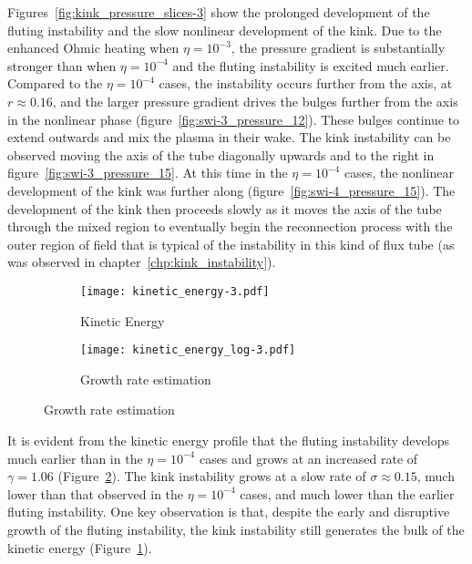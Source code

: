 Figures~\ref{fig:kink_pressure_slices-3} show the prolonged development of the fluting instability and the slow nonlinear development of the kink. Due to the enhanced Ohmic heating when $\eta=10^{-3}$, the pressure gradient is substantially stronger than when $\eta=10^{-4}$ and the fluting instability is excited much earlier. Compared to the $\eta=10^{-4}$ cases, the instability occurs further from the axis, at $r\approx0.16$, and the larger pressure gradient drives the bulges further from the axis in the nonlinear phase (figure~\ref{fig:swi-3_pressure_12}). These bulges continue to extend outwards and mix the plasma in their wake. The kink instability can be observed moving the axis of the tube diagonally upwards and to the right in figure~\ref{fig:swi-3_pressure_15}. At this time in the $\eta=10^{-4}$ cases, the nonlinear development of the kink was further along (figure~\ref{fig:swi-4_pressure_15}). The development of the kink then proceeds slowly as it moves the axis of the tube through the mixed region to eventually begin the reconnection process with the outer region of field that is typical of the instability in this kind of flux tube (as was observed in chapter~\ref{chp:kink_instability}).

\begin{figure}[t]
  \centering
    \begin{subfigure}{0.49\textwidth}
      \texttt{[image: kinetic\_energy-3.pdf]}
      \caption{Kinetic Energy}
      \label{fig:kink_ke-3}
    \end{subfigure}
    \hfill
    \begin{subfigure}{0.49\textwidth}
      \texttt{[image: kinetic\_energy\_log-3.pdf]}
      \caption{Growth rate estimation}
      \label{fig:kink_ke_log-3}
    \end{subfigure}
\label{fig:kink_str8_ke-3}%
\end{figure}

It is evident from the kinetic energy profile that the fluting instability develops much earlier than in the $\eta=10^{-4}$ cases and grows at an increased rate of $\gamma = 1.06$ (Figure~\ref{fig:kink_ke_log-3}). The kink instability grows at a slow rate of $\sigma \approx 0.15$, much lower than that observed in the $\eta=10^{-4}$ cases, and much lower than the earlier fluting instability. One key observation is that, despite the early and disruptive growth of the fluting instability, the kink instability still generates the bulk of the kinetic energy (Figure~\ref{fig:kink_ke-3}).

